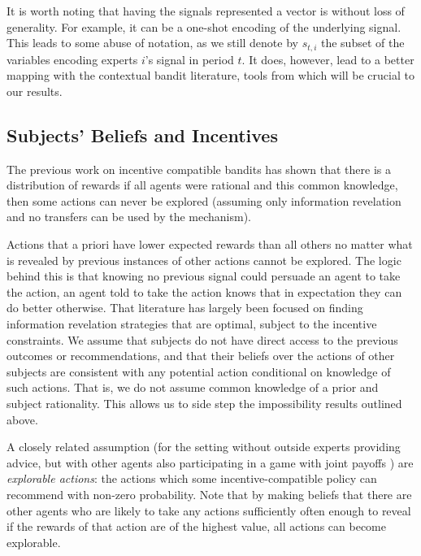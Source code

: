It is worth noting that having the signals represented a vector is without loss of generality.
For example, it can be a one-shot encoding of the underlying signal.
This leads to some abuse of notation, as we still denote by $s_{t,i}$ the subset of the variables encoding experts $i$'s signal in period $t$. It does, however, lead to a better mapping with the contextual bandit literature, tools from which will be crucial to our results. 

\subsection{Subjects' Beliefs and Incentives}

The previous work on incentive compatible bandits \cite{kremer2014implementing,mansour2015bayesian} has shown that there is a distribution of rewards if all agents were rational and this common knowledge, then some actions can never be explored (assuming only information revelation and no transfers can be used by the mechanism). 

Actions that a priori have lower expected rewards than all others no matter what is revealed by previous instances of other actions cannot be explored.
The logic behind this is that knowing no previous signal could persuade an agent to take the action, an agent told to take the action knows that in expectation they can do better otherwise.
That literature has largely been focused on finding information revelation strategies that are optimal, subject to the incentive constraints. 
We assume that subjects do not have direct access to the previous outcomes or recommendations, and that their beliefs over the actions of other subjects are consistent with any potential action conditional on knowledge of such actions.
That is, we do not assume common knowledge of a prior and subject rationality.
This allows us to side step the impossibility results outlined above. 

A closely related assumption (for the setting without outside experts providing advice, but with other agents also participating in a game with joint payoffs \cite{mansour2016bayesian}) are \emph{explorable actions}: the actions which some incentive-compatible policy can recommend with non-zero probability. Note that by making beliefs that there are other agents who are likely to take any actions sufficiently often enough to reveal if the rewards of that action are of the highest value, all actions can become explorable.


